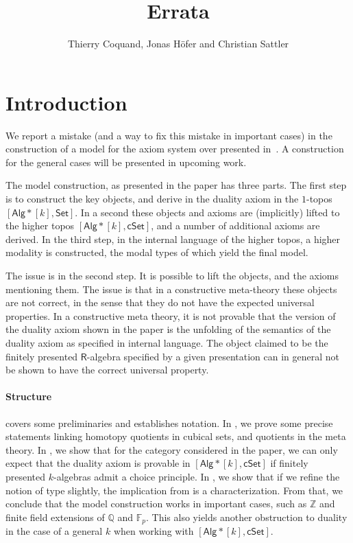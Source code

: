 \documentclass[10pt,a4paper]{article}
\theoremstyle{definition}
\theoremstyle{remark}
\newcommand{\ints}{\mathbb{Z}}
\newcommand{\rats}{\mathbb{Q}}
\newcommand{\Set}{\mathsf{Set}}
\newcommand{\cSet}{\mathsf{cSet}}
\newcommand{\Alg}{\mathsf{Alg}}
\newcommand\R{\mathsf{R}}
\begin{document}
\title{Errata}

\author{Thierry Coquand, Jonas H\"ofer and Christian Sattler}
\date{}
\maketitle


\section*{Introduction}

We report a mistake (and a way to fix this mistake in important cases) in the construction of a model for the axiom system over \HoTT{} presented in~\cite{draft}.
A construction for the general cases will be presented in upcoming work.

The model construction, as presented in the paper has three parts.
The first step is to construct the key objects, and derive in the duality axiom in the \(1\)-topos \([\Alg*[k], \Set]\).
In a second these objects and axioms are (implicitly) lifted to the higher topos \([\Alg*[k], \cSet]\), and a number of additional axioms are derived.
In the third step, in the internal language of the higher topos, a higher modality is constructed, the modal types of which yield the final model.

The issue is in the second step.
It is possible to lift the objects, and the axioms mentioning them.
The issue is that in a constructive meta-theory these objects are not correct, in the sense that they do not have the expected universal properties.
In a constructive meta theory, it is not provable that the version of the duality axiom shown in the paper is the unfolding of the semantics of the duality axiom as specified in internal language.
The object claimed to be the finitely presented \(\R\)-algebra specified by a given presentation can in general not be shown to have the correct universal property. 

\paragraph{Structure}
 covers some preliminaries and establishes notation.
In , we prove some precise statements linking homotopy quotients in cubical sets, and quotients in the meta theory.
In , we show that for the category considered in the paper, we can only expect that the duality axiom is provable in \([\Alg*[k], \cSet]\) if finitely presented \(k\)-algebras admit a choice principle.
In , we show that if we refine the notion of type slightly, the implication from  is a characterization.
From that, we conclude that the model construction works in important cases, such as \(\ints\) and finite field extensions of \(\rats\) and \(\mathbb{F}_p\). 
This also yields another obstruction to duality in the case of a general \(k\) when working with \([\Alg*[k], \cSet]\). 
\end{document}

